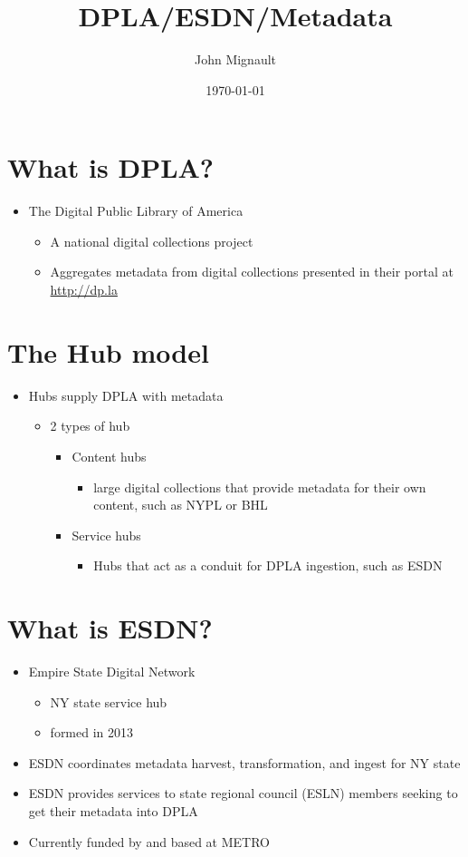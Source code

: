\documentclass[11pt]{article}
\author{John Mignault}
\date{\today}
\title{DPLA/ESDN/Metadata}
\begin{document}
\maketitle

\section*{What is DPLA?}
\label{sec:org86cfb0f}
\begin{itemize}
\item The Digital Public Library of America
\begin{itemize}
\item A national digital collections project
\item Aggregates metadata from digital collections presented in their portal at \href{http://dp.la}{\url{http://dp.la}}
\end{itemize}
\end{itemize}

\section*{The Hub model}
\label{sec:orgbf61d68}
\begin{itemize}
\item Hubs supply DPLA with metadata
\begin{itemize}
\item 2 types of hub
\begin{itemize}
\item Content hubs
\begin{itemize}
\item large digital collections that provide metadata for their own content, such as NYPL or BHL
\end{itemize}
\item Service hubs 
\begin{itemize}
\item Hubs that act as a conduit for DPLA ingestion, such as ESDN
\end{itemize}
\end{itemize}
\end{itemize}
\end{itemize}

\section*{What is ESDN?}
\label{sec:org070c9b1}
\begin{itemize}
\item Empire State Digital Network
\begin{itemize}
\item NY state service hub
\item formed in 2013
\end{itemize}
\item ESDN coordinates metadata harvest, transformation, and ingest for NY state
\item ESDN provides services to state regional council (ESLN) members seeking to get their metadata into
DPLA
\item Currently funded by and based at METRO
\end{itemize}
\end{document}
